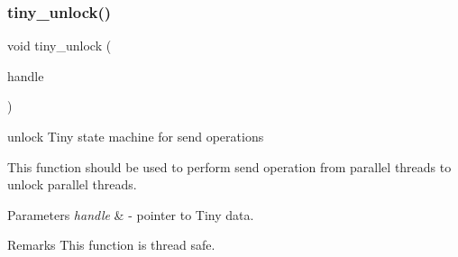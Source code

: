 \subsubsection{\texorpdfstring{tiny\+\_\+unlock()}{tiny\_unlock()}}
{\footnotesize\ttfamily void tiny\+\_\+unlock (\begin{DoxyParamCaption}\item[{\hyperlink{structSTinyData}{S\+Tiny\+Data} $\ast$}]{handle }\end{DoxyParamCaption})}



unlock Tiny state machine for send operations 

This function should be used to perform send operation from parallel threads to unlock parallel threads.


\begin{DoxyParams}{Parameters}
{\em handle} & -\/ pointer to Tiny data. \\
\hline
\end{DoxyParams}
\begin{DoxyRemark}{Remarks}
This function is thread safe. 
\end{DoxyRemark}
